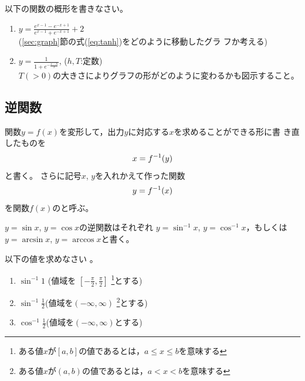 \documentclass[twocolumn,11pt]{jarticle}
\begin{document}
\nquestion
以下の関数の概形を書きなさい。
\begin{enumerate}
\item
  $\displaystyle y=\frac{e^{x-1}-e^{-x+1}}{e^{x-1}+e^{-x+1}}+2$\\
  (\ref{sec:graph}節の式(\ref{eq:tanh})をどのように移動したグラ
  フか考える)
\item $\displaystyle y=\frac{1}{1+e^{-\frac{x-h}{T}}}$,
  \quad($h,T$:定数) \\
  $T(>0)$の大きさによりグラフの形がどのように変わるかも図示すること。
\end{enumerate}

\subsection{逆関数}
関数$y=f(x)$を変形して，出力$y$に対応する$x$を求めることができる形に書
き直したものを
\begin{align}
  x=f^{-1}(y)\notag
\end{align}
と書く。
さらに記号$x$, $y$を入れかえて作った関数
\begin{align}
  y=f^{-1}(x)\notag
\end{align}
を関数$f(x)$のと呼ぶ。

\comment
$y=\sin x$, $y=\cos x$の逆関数はそれぞれ
$y=\sin^{-1} x$, $y=\cos^{-1}x$，もしくは$y=\arcsin x$, $y=\arccos x$と書く。

\nquestion
以下の値を求めなさい
。
\begin{enumerate}
\item\label{item:arcsin-1} $\sin^{-1}1$ (値域を
  $\displaystyle[-\frac{\pi}{2},\frac{\pi}{2}]$\quad
\footnote{ある値$x$が$[a,b]$の値であるとは，$a\le x\le b$を意味する}とする)
\item\label{item:arcsin1/2} $\displaystyle\sin^{-1}\frac{1}{2}$\quad (値域を$(-\infty,\infty)$
\footnote{ある値$x$が$(a,b)$の値であるとは，$a< x< b$を意味する}とする)
\item\label{item:arccos1/2} $\displaystyle\cos^{-1}\frac{1}{2}$\quad (値域を$(-\infty,\infty)$とする)
\end{enumerate}
\end{document}
